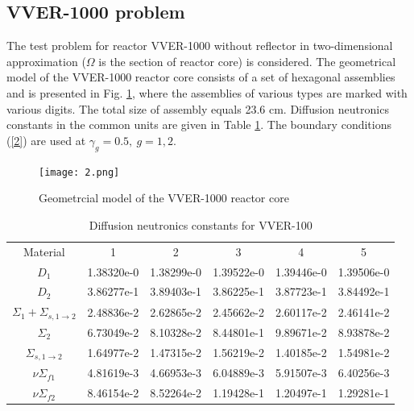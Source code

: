 \documentclass[authoryear]{elsarticle}
\begin{document}
\subsection{VVER-1000 problem} 

The test problem for reactor VVER-1000 without reflector   \cite{chao} in two-dimensional approximation 
($\Omega$ is the section of reactor core) is considered. 
The geometrical model of the VVER-1000 reactor core consists of a set of hexagonal assemblies and is presented in Fig. \ref{fig:1}, where the assemblies of various types are marked with various digits. The total size of assembly equals 23.6 cm. Diffusion neutronics constants in the common units are given in Table \ref{t-1}. 
The boundary conditions (\ref{2}) are used at $\gamma_g = 0.5, \ g = 1,2$. 

\begin{figure}[htp]
  \begin{center}
    \texttt{[image: 2.png]}
	\caption{Geometrcial model of the VVER-1000 reactor core}
	\label{fig:1}
  \end{center}
\end{figure} 

\begin{table}[htp]
\caption{Diffusion neutronics constants for VVER-100}
\label{t-1}
\begin{center}
\begin{tabular}{cccccc}
\rowcolor{col1}
Material & 1 & 2 & 3 & 4 & 5\\
\rowcolor{col3}
$D_1$ & 1.38320e-0 & 1.38299e-0  & 1.39522e-0  & 1.39446e-0  & 1.39506e-0 \\
\rowcolor{col2}
$D_2$ & 3.86277e-1 & 3.89403e-1 & 3.86225e-1 & 3.87723e-1 & 3.84492e-1 \\
\rowcolor{col3}
$\Sigma_1 + \Sigma_{s,1\rightarrow 2}$ & 2.48836e-2 & 2.62865e-2 & 2.45662e-2 & 2.60117e-2 & 2.46141e-2\\
\rowcolor{col2}
$\Sigma_2$ & 6.73049e-2 & 8.10328e-2 & 8.44801e-1 & 9.89671e-2 & 8.93878e-2\\
\rowcolor{col3}
$\Sigma_{s,1\rightarrow 2}$ & 1.64977e-2 & 1.47315e-2 & 1.56219e-2 & 1.40185e-2 & 1.54981e-2\\
\rowcolor{col2}
$\nu\Sigma_{f1}$ & 4.81619e-3 & 4.66953e-3 & 6.04889e-3 & 5.91507e-3 & 6.40256e-3\\
\rowcolor{col3}
$\nu\Sigma_{f2}$ & 8.46154e-2 & 8.52264e-2 & 1.19428e-1 & 1.20497e-1 & 1.29281e-1\\
\end{tabular}
\end{center}
\end{table}
\end{document}
